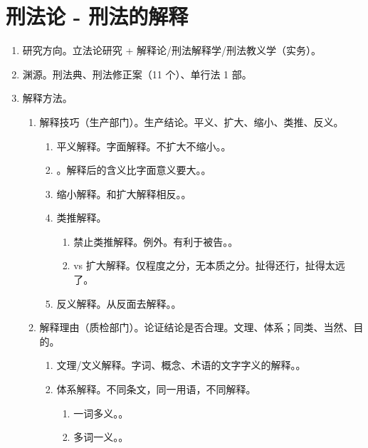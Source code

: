\section{刑法论 - 刑法的解释}
\begin{enumerate}
  \item 研究方向。立法论研究 + 解释论/刑法解释学/刑法教义学（实务）。
  \item 渊源。刑法典、刑法修正案（11 个）、单行法 1 部。
  \item 解释方法。
        \begin{enumerate}
          \item 解释技巧（生产部门）。生产结论。平义、扩大、缩小、类推、反义。
                \begin{enumerate}
                  \item 平义解释。字面解释。不扩大不缩小。。
                  \item {}。解释后的含义比字面意义要大。。
                  \item 缩小解释。和扩大解释相反。。
                  \item 类推解释。
                        \begin{enumerate}
                          \item 禁止类推解释。例外。有利于被告。。
                          \item vs 扩大解释。仅程度之分，无本质之分。扯得还行，扯得太远了。
                        \end{enumerate}
                  \item 反义解释。从反面去解释。。
                \end{enumerate}
          \item 解释理由（质检部门）。论证结论是否合理。文理、体系；同类、当然、目的。
                \begin{enumerate}
                  \item 文理/文义解释。字词、概念、术语的文字字义的解释。。
                  \item 体系解释。不同条文，同一用语，不同解释。
                        \begin{enumerate}
                          \item 一词多义。。
                          \item 多词一义。。

\end{enumerate}
\end{enumerate}
\end{enumerate}
\end{enumerate}
